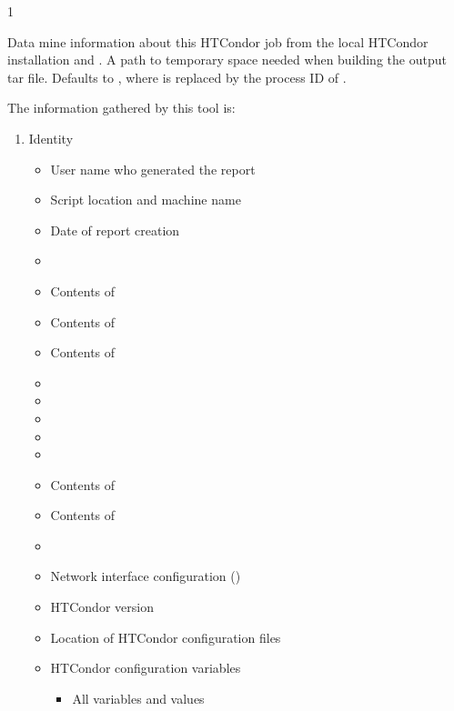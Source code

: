 \begin{ManPage}{\label{man-condor-gather-info}}{1}
\begin{Options}
  {Data mine information about this HTCondor job from the local 
  HTCondor installation and .}
  {A path to temporary space needed when building the output tar file.
  Defaults to , where  is replaced by
  the process ID of .}
\end{Options}

\GenRem

The information gathered by this tool is:

\begin{enumerate}
	\item Identity
	\begin{itemize}
          \item User name who generated the report
          \item Script location and machine name
          \item Date of report creation
          \item {}
          \item Contents of 
          \item Contents of 
          \item Contents of 
          \item {}
          \item {}
          \item {}
          \item {}
          \item {}
          \item Contents of 
          \item Contents of 
          \item {}
          \item Network interface configuration ()
          \item HTCondor version
          \item Location of HTCondor configuration files
          \item HTCondor configuration variables
		  \begin{itemize}
                \item All variables and values

\end{itemize}
\end{itemize}
\end{enumerate}
\end{ManPage}
